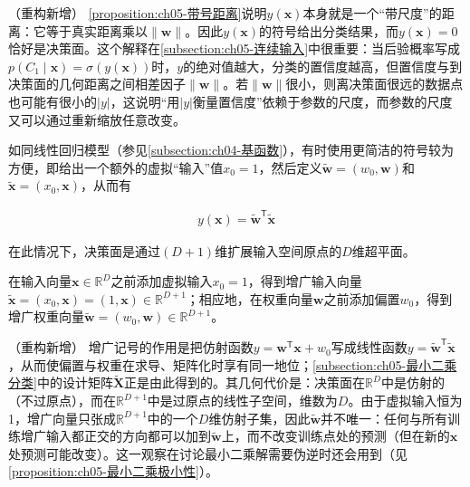 \documentclass[../../main.tex]{subfiles}
\begin{document}
\begin{remark}（重构新增）
\cref{proposition:ch05-带号距离}说明$y(\boldsymbol{x})$本身就是一个“带尺度”的距离：它等于真实距离乘以$\lVert\boldsymbol{w}\rVert$。因此$y(\boldsymbol{x})$的符号给出分类结果，而$y(\boldsymbol{x})=0$恰好是决策面。这个解释在\cref{subsection:ch05-连续输入}中很重要：当后验概率写成$p(C_1\mid\boldsymbol{x})=\sigma(y(\boldsymbol{x}))$时，$y$的绝对值越大，分类的置信度越高，但置信度与到决策面的几何距离之间相差因子$\lVert\boldsymbol{w}\rVert$。若$\lVert\boldsymbol{w}\rVert$很小，则离决策面很远的数据点也可能有很小的$|y|$，这说明“用$|y|$衡量置信度”依赖于参数的尺度，而参数的尺度又可以通过重新缩放任意改变。
\end{remark}

如同线性回归模型（参见\cref{subsection:ch04-基函数}），有时使用更简洁的符号较为方便，即给出一个额外的虚拟“输入”值$x_0=1$，然后定义$\tilde{\boldsymbol{w}}=(w_0,\boldsymbol{w})$和$\tilde{\boldsymbol{x}}=(x_0,\boldsymbol{x})$，从而有

\begin{align}
  y(\boldsymbol{x})=\tilde{\boldsymbol{w}}^{\mathsf{T}}\tilde{\boldsymbol{x}}
  \label{align:ch05-增广判别}
\end{align}

在此情况下，决策面是通过$(D+1)$维扩展输入空间原点的$D$维超平面。

\begin{definition}[增广权重与增广输入]\label{definition:ch05-增广记号}
在输入向量$\boldsymbol{x}\in\mathbb{R}^{D}$之前添加虚拟输入$x_0=1$，得到增广输入向量$\tilde{\boldsymbol{x}}=(x_0,\boldsymbol{x})=(1,\boldsymbol{x})\in\mathbb{R}^{D+1}$；相应地，在权重向量$\boldsymbol{w}$之前添加偏置$w_0$，得到增广权重向量$\tilde{\boldsymbol{w}}=(w_0,\boldsymbol{w})\in\mathbb{R}^{D+1}$。
\end{definition}

\begin{remark}（重构新增）
增广记号的作用是把仿射函数$y=\boldsymbol{w}^{\mathsf{T}}\boldsymbol{x}+w_0$写成线性函数$y=\tilde{\boldsymbol{w}}^{\mathsf{T}}\tilde{\boldsymbol{x}}$，从而使偏置与权重在求导、矩阵化时享有同一地位；\cref{subsection:ch05-最小二乘分类}中的设计矩阵$\tilde{\boldsymbol{X}}$正是由此得到的。其几何代价是：决策面在$\mathbb{R}^{D}$中是仿射的（不过原点），而在$\mathbb{R}^{D+1}$中是过原点的线性子空间，维数为$D$。由于虚拟输入恒为1，增广向量只张成$\mathbb{R}^{D+1}$中的一个$D$维仿射子集，因此$\tilde{\boldsymbol{w}}$并不唯一：任何与所有训练增广输入都正交的方向都可以加到$\tilde{\boldsymbol{w}}$上，而不改变训练点处的预测（但在新的$\boldsymbol{x}$处预测可能改变）。这一观察在讨论最小二乘解需要伪逆时还会用到（见\cref{proposition:ch05-最小二乘极小性}）。
\end{remark}
\end{document}
